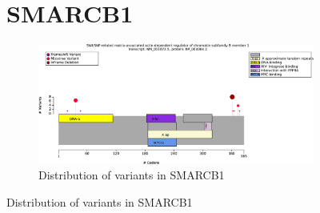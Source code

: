 
\begin{figure}[htbp]
    \section*{SMARCB1}
\centering
\begin{subfigure}[b]{0.75\textwidth}
\centering
\includegraphics[width=\textwidth]{ img/SMARCB1_protein_diagram.pdf} 
\captionsetup{justification=raggedright,singlelinecheck=false}
\caption{Distribution of variants in SMARCB1}
\end{subfigure}


\end{figure}
